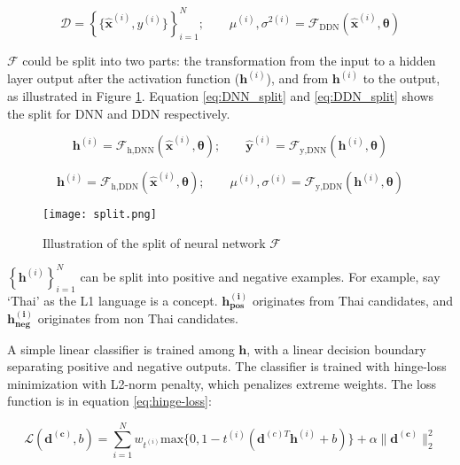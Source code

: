 \begin{equation} \label{eq:DDN}
    \mathcal{D} = \left\{\{\mathbf{\hat{x}}^{(i)},y^{(i)}\}\right\}_{i=1}^{N}; \qquad \mu^{(i)}, \sigma^{2(i)} = \mathcal{F}_{\text{DDN}}(\mathbf{\hat{x}}^{(i)}, \boldsymbol{\theta})
\end{equation}

$\mathcal{F}$ could be split into two parts: the transformation from the input to a hidden layer output after the activation function ($\mathbf{h}^{(i)}$), and from $\mathbf{h}^{(i)}$ to the output, as illustrated in Figure \ref{fig:split}. Equation \ref{eq:DNN_split} and \ref{eq:DDN_split} shows the split for DNN and DDN respectively.

\begin{equation} \label{eq:DNN_split}
    \mathbf{h}^{(i)} = \mathcal{F}_{\text{h,DNN}}(\mathbf{\hat{x}}^{(i)}, \boldsymbol{\theta}); \qquad \mathbf{\hat{y}}^{(i)} = \mathcal{F}_{\text{y,DNN}}(\mathbf{h}^{(i)}, \boldsymbol{\theta})
\end{equation}

\begin{equation} \label{eq:DDN_split}
    \mathbf{h}^{(i)} = \mathcal{F}_{\text{h,DDN}}(\mathbf{\hat{x}}^{(i)}, \boldsymbol{\theta}); \qquad \mu^{(i)}, \sigma^{(i)} = \mathcal{F}_{\text{y,DDN}}(\mathbf{h}^{(i)}, \boldsymbol{\theta})
\end{equation}

\begin{figure}[H]
    \centering
    \texttt{[image: split.png]}
    \caption{Illustration of the split of neural network $\mathcal{F}$}
    \label{fig:split}
\end{figure}


$\left\{ \mathbf{h}^{(i)} \right\}_{i=1}^N$ can be split into positive and negative examples. For example, say `Thai' as the L1 language is a concept. $\boldsymbol{h_{pos}^{(i)}}$ originates from Thai candidates, and $\boldsymbol{h_{neg}^{(i)}}$ originates from non Thai candidates.

A simple linear classifier is trained among $\boldsymbol{h}$, with a linear decision boundary separating positive and negative outputs. The classifier is trained with hinge-loss minimization with L2-norm penalty, which penalizes extreme weights. The loss function is in equation \ref{eq:hinge-loss}:

\begin{equation} \label{eq:hinge-loss}
    \mathcal{L}(\boldsymbol{d^{(c)}}, b) = \sum_{i=1}^{N} w_{t^(i)} \mathrm{max} \{0, 1 - t^{(i)}(\boldsymbol{d}^{(c)T}\boldsymbol{h}^{(i)} + b)\} + \alpha \|\boldsymbol{d^{(c)}}\|_2^2
\end{equation}

